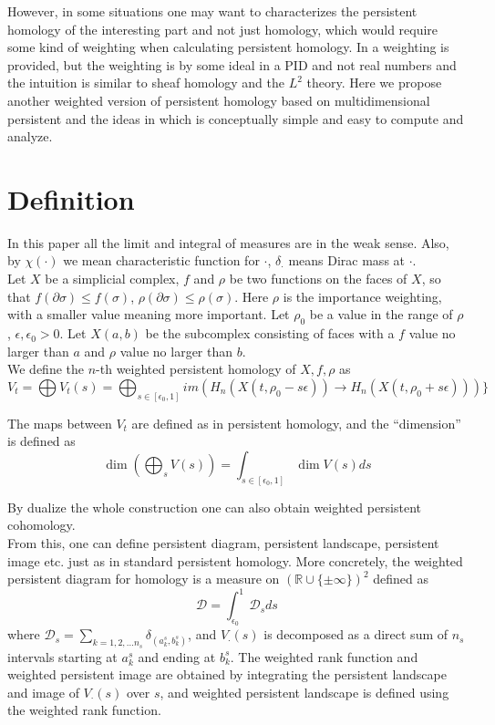 \documentclass[11pt]{article}
\theoremstyle{plain}
\theoremstyle{definition}
\theoremstyle{definition}
\theoremstyle{definition}
\theoremstyle{definition}
\theoremstyle{definition}
\theoremstyle{definition}
\theoremstyle{definition}
\theoremstyle{definition}
\begin{document}
However, in some situations one may want to characterizes the persistent homology of the interesting part and not just homology, which would require some kind of weighting when calculating persistent homology. In \cite{Be} a weighting is provided, but the weighting is by some ideal in a PID and not real numbers and the intuition is similar to sheaf homology and the $L^2$ theory. Here we propose another weighted version of persistent homology based on multidimensional persistent \cite{CZ, CSZ} and the ideas in \cite{B} which is conceptually simple and easy to compute and analyze.

\section{Definition}

In this paper all the limit and integral of measures are in the weak sense. Also, by $\chi(\cdot)$ we mean characteristic function for $\cdot$, $\delta_\cdot$ means Dirac mass at $\cdot$.\\

Let $X$ be a simplicial complex, $f$ and $\rho$ be two functions on the faces of $X$, so that $f(\partial\sigma)\leq f(\sigma)$, $\rho(\partial\sigma)\leq\rho(\sigma)$. Here $\rho$ is the importance weighting, with a smaller value meaning more important. Let $\rho_0$ be a value in the range of $\rho$, $\epsilon, \epsilon_0>0$. Let $X(a, b)$ be the subcomplex consisting of faces with a $f$ value no larger than $a$ and $\rho$ value no larger than $b$. \\

We define the $n$-th weighted persistent homology of $X, f, \rho$ as
\begin{equation}
V_t=\bigoplus V_t(s)=\bigoplus_{s\in [\epsilon_0,1]} im(H_n(X(t, \rho_0-s\epsilon))\rightarrow H_n(X(t, \rho_0+s\epsilon)))\}
\end{equation}

The maps between $V_t$ are defined as in persistent homology, and the ``dimension'' is defined as 
\begin{equation}
\dim(\bigoplus_s V(s))=\int_{s\in [\epsilon_0,1]}\dim V(s) ds
\end{equation}

By dualize the whole construction one can also obtain weighted persistent cohomology.\\

From this, one can define persistent diagram, persistent landscape, persistent image etc. just as in standard persistent homology. More concretely, the weighted persistent diagram for homology is a measure on $(\mathbb{R}\cup\{\pm\infty\})^2$ defined as 
\begin{equation}
\mathcal{D}=\int_{\epsilon_0}^1 \mathcal{D}_s ds
\end{equation}
where $\mathcal{D}_s=\sum_{k=1,2,\dots n_s}\delta_{(a^s_k, b^s_k)}$, and $V_\cdot(s)$ is decomposed as a direct sum of $n_s$ intervals starting at $a^s_k$ and ending at $b^s_k$. The weighted rank function and weighted persistent image are obtained by integrating the persistent landscape and image of $V_\cdot(s)$ over $s$, and weighted persistent landscape is defined using the weighted rank function.
\end{document}
